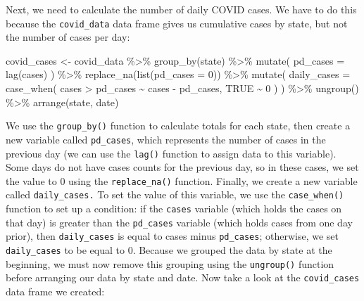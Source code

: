 \documentclass[
]{book}
\newenvironment{Shaded}{\begin{snugshade}}{\end{snugshade}}
\newcommand{\AttributeTok}[1]{\textcolor[rgb]{0.77,0.63,0.00}{#1}}
\newcommand{\ConstantTok}[1]{\textcolor[rgb]{0.00,0.00,0.00}{#1}}
\newcommand{\DecValTok}[1]{\textcolor[rgb]{0.00,0.00,0.81}{#1}}
\newcommand{\FunctionTok}[1]{\textcolor[rgb]{0.00,0.00,0.00}{#1}}
\newcommand{\NormalTok}[1]{#1}
\newcommand{\OtherTok}[1]{\textcolor[rgb]{0.56,0.35,0.01}{#1}}
\newcommand{\SpecialCharTok}[1]{\textcolor[rgb]{0.00,0.00,0.00}{#1}}
\begin{document}
Next, we need to calculate the number of daily COVID cases. We have to do this because the \texttt{covid\_data} data frame gives us cumulative cases by state, but not the number of cases per day:

\begin{Shaded}
\begin{Highlighting}[]
\NormalTok{covid\_cases }\OtherTok{\textless{}{-}}\NormalTok{ covid\_data }\SpecialCharTok{\%\textgreater{}\%}
  \FunctionTok{group\_by}\NormalTok{(state) }\SpecialCharTok{\%\textgreater{}\%}
  \FunctionTok{mutate}\NormalTok{(}
    \AttributeTok{pd\_cases =} \FunctionTok{lag}\NormalTok{(cases)}
\NormalTok{  ) }\SpecialCharTok{\%\textgreater{}\%}
  \FunctionTok{replace\_na}\NormalTok{(}\FunctionTok{list}\NormalTok{(}\AttributeTok{pd\_cases =} \DecValTok{0}\NormalTok{)) }\SpecialCharTok{\%\textgreater{}\%}
  \FunctionTok{mutate}\NormalTok{(}
    \AttributeTok{daily\_cases =} \FunctionTok{case\_when}\NormalTok{(}
\NormalTok{      cases }\SpecialCharTok{\textgreater{}}\NormalTok{ pd\_cases }\SpecialCharTok{\textasciitilde{}}\NormalTok{ cases }\SpecialCharTok{{-}}\NormalTok{ pd\_cases,}
      \ConstantTok{TRUE} \SpecialCharTok{\textasciitilde{}} \DecValTok{0}
\NormalTok{    )}
\NormalTok{  ) }\SpecialCharTok{\%\textgreater{}\%}
  \FunctionTok{ungroup}\NormalTok{() }\SpecialCharTok{\%\textgreater{}\%}
  \FunctionTok{arrange}\NormalTok{(state, date)}
\end{Highlighting}
\end{Shaded}

We use the \texttt{group\_by()} function to calculate totals for each state, then create a new variable called \texttt{pd\_cases}, which represents the number of cases in the previous day (we can use the \texttt{lag()} function to assign data to this variable). Some days do not have cases counts for the previous day, so in these cases, we set the value to 0 using the \texttt{replace\_na()} function. Finally, we create a new variable called \texttt{daily\_cases.} To set the value of this variable, we use the \texttt{case\_when()} function to set up a condition: if the \texttt{cases} variable (which holds the cases on that day) is greater than the \texttt{pd\_cases} variable (which holds cases from one day prior), then \texttt{daily\_cases} is equal to cases minus \texttt{pd\_cases}; otherwise, we set \texttt{daily\_cases} to be equal to 0. Because we grouped the data by state at the beginning, we must now remove this grouping using the \texttt{ungroup()} function before arranging our data by state and date. Now take a look at the \texttt{covid\_cases} data frame we created:
\end{document}
